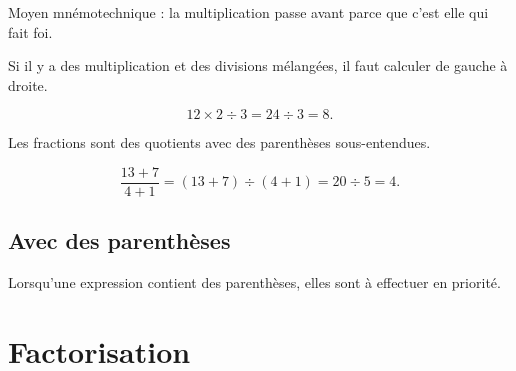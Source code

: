 Moyen mnémotechnique : la multiplication passe avant parce que c'est elle qui fait foi.

\begin{remark}
    Si il y a des multiplication et des divisions mélangées, il faut calculer de gauche à droite.
\end{remark}

\begin{example}
    \begin{equation}
        12\times 2\div 3=24\div 3=8.
    \end{equation}
\end{example}

\begin{remark}
    Les fractions sont des quotients avec des parenthèses sous-entendues.
\end{remark}

\begin{example}
    \begin{equation}
        \frac{ 13+7 }{ 4+1 }=(13+7)\div (4+1)=20\div 5=4.
    \end{equation}
\end{example}

\subsection{Avec des parenthèses}

\begin{Aretenir}
    Lorsqu'une expression contient des parenthèses, elles sont à effectuer en priorité.
\end{Aretenir}

\section{Factorisation}



